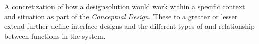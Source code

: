 \begin{tool} \label{tool:concrete_scenario} 
  A concretization of how a designsolution would work within a specific context and situation as part of the \emph{Conceptual Design}. These to a greater or lesser extend further define interface designs and the different types of and relationship between functions in the system. \cite[p. 64]{benyon14}
\end{tool}